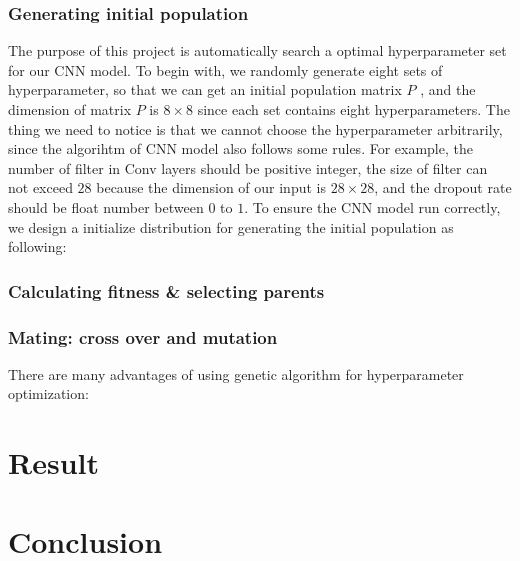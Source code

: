 \documentclass[12pt]{article}
\begin{document}
\subsubsection{Generating initial population}
The purpose of this project is automatically search a optimal hyperparameter set for our CNN model. To begin with, we randomly generate eight sets of hyperparameter, so that we can get an initial  population matrix $P$ , and the dimension of matrix $P$ is $8 \times 8$ since each set contains eight hyperparameters. The thing we need to notice is that we cannot choose the hyperparameter arbitrarily, since the algorihtm of CNN model also follows some rules. For example, the number of filter in Conv layers should be positive integer, the size of filter can not exceed $28$ because the dimension of our input is $28 \times 28$, and the dropout rate should be float number between $0$ to $1$. To ensure the CNN model run correctly, we design a initialize distribution for generating the initial population as following:
\subsubsection{Calculating fitness \& selecting parents}

\subsubsection{Mating: cross over and mutation}
There are many advantages of using genetic algorithm for hyperparameter optimization:
\section{Result}

\section{Conclusion}
\end{document}

